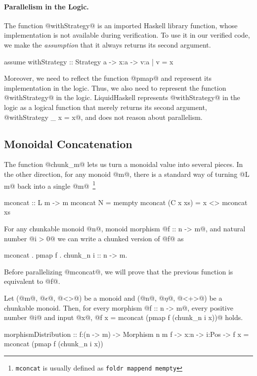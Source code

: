 \paragraph{Parallelism in the Logic.}
The function @withStrategy@ is an imported Haskell library function,
whose implementation is not available during verification.
%
To use it in our verified code, we make the \textit{assumption}
that it always returns its second argument.
\begin{code}
assume withStrategy :: Strategy a -> x:a -> {v:a | v = x}
\end{code}
%
Moreover, we need to reflect the function @pmap@ and represent its
implementation in the logic.
%
Thus, we also need to represent the function @withStrategy@ in the logic.
%
LiquidHaskell represents @withStrategy@ in the logic as a logical
function that merely returns
its second argument, @withStrategy _ x = x@,
and does not reason about parallelism.


\subsection{Monoidal Concatenation}\label{subsec:mconcat}
The function @chunk_m@ lets us turn a monoidal value into several
pieces. In the other direction, for any monoid @m@, there is a
standard way of turning @L m@ back into a single @m@~\footnote{\texttt{mconcat} is usually defined as \texttt{foldr mappend mempty}}
\begin{code}
  mconcat :: L m -> m
  mconcat N        = mempty
  mconcat (C x xs) = x <> mconcat xs
\end{code}
%
For any chunkable monoid @n@,
%
monoid morphism @f :: n -> m@,
%
and natural number @i > 0@
%
we can write a chunked version of @f@ as
\begin{code}
  mconcat . pmap f . chunk_n i :: n -> m.
\end{code}
Before parallelizing @mconcat@, we will prove that the previous function is equivalent to @f@.

\begin{theorem}\label{theorem:monoid:distribution}
Let (@m@, @$\epsilon$@, @<>@) be a monoid
and (@n@, @$\eta$@, @<+>@) be a chunkable monoid.
%
Then, for every morphism @f :: n -> m@,
every positive number @i@ and input @x@,
@f x = mconcat (pmap f (chunk_n i x))@ holds.
%
\begin{code}
morphismDistribution
  :: f:(n -> m) -> Morphism n m f -> x:n -> i:Pos
  -> {f x = mconcat (pmap f (chunk_n i x))}
\end{code}
\end{theorem}

